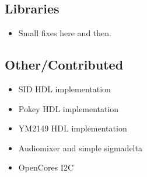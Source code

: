 \subsection*{Libraries}
\begin{itemize}
 \item Small fixes here and then.
\end{itemize}

\subsection*{Other/Contributed}
\begin{itemize}
\item SID HDL implementation
\item Pokey HDL implementation
\item YM2149 HDL implementation
\item Audiomixer and simple sigmadelta
\item OpenCores I2C
\end{itemize}

